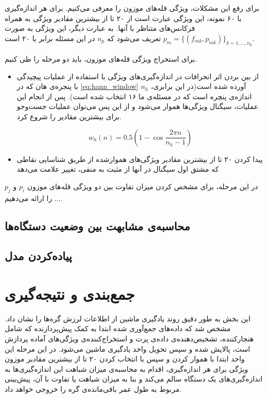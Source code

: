 برای رفع این مشکلات، ویژگی قله‌های موزون را معرفی می‌کنیم. برای هر اندازه‌گیری با ۶۰ نمونه، این ویژگی عبارت است از ۲۰ تا از بیشترین مقادیر ویژگی  به همراه فرکانس‌های متناظر با آنها. به عبارت دیگر، این ویژگی به صورت $p_m = \{(f_{mk}, p_{mk})\}_{k=1, ..., n_p}$ تعریف می‌شود که $n_p$ در این مسئله برابر با ۲۰ است.

برای استخراج ویژگی قله‌های موزون، باید دو مرحله را طی کنیم.
\begin{itemize}
\item از بین بردن اثر انحرافات در اندازه‌گیری‌های ویژگی‌  با استفاده از عملیات پیچیدگی با پنجره‌ی هان که در \cref{eq:hann_window} آورده شده است(در این برابری، $n_h$ اندازه‌ی پنچره است که در مسئله‌ی ما ۱۶ انتخاب شده است). پس از انجام این عملیات، سیگنال ویژگی‌ها هموار می‌شود و از این پس می‌توان عملیات جست‌وجو برای بیشترین مقادیر را شروع کرد.

\begin{equation}
\label{eq:hann_window}
w_h(n) = 0.5 (1 - \cos{\dfrac{2\pi n}{n_h - 1}})
\end{equation}

\item پیدا کردن ۲۰ تا از بیشترین مقادیر ویژگی‌های هموارشده از طریق شناسایی نقاطی که مشتق اول سیگنال در آنها از مثبت به منفی، تغییر علامت می‌دهد

\end{itemize}

در این مرحله، برای مشخص کردن میزان تفاوت بین دو ویژگی قله‌های موزون $p_i$ و $p_j$ ... را ارائه می‌دهیم.

\subsection{محاسبه‌ی مشابهت بین وضعیت دستگاه‌ها}

\subsection{پیاده‌کردن مدل}


\section{جمع‌بندی و نتیجه‌گیری}
این بخش به طور دقیق روند یادگیری ماشین از اطلاعات لرزش گره‌ها را نشان داد. مشخص شد که داده‌های جمع‌آوری شده ابتدا به کمک پیش‌پردازنده که شامل هنجارکننده، تشخیص‌دهنده‌ی داده‌ی پرت و استخراج‌کننده‌ی ویژگی‌های آماده پردازش است، پالایش شده و سپس تحویل واحد یادگیری ماشین می‌شود. در این مرحله این واحد ابتدا با هموار کردن و سپس با انتخاب کردن ۲۰ تا از بیشترین مقادیر موزون ویژگی  برای هر اندازه‌گیری، اقدام به محاسبه‌ی میزان شباهت این اندازه‌گیری‌ها به اندازه‌گیری‌های یک دستگاه سالم می‌کند و بنا به میزان شباهت یا تفاوت با آن، پیش‌بینی مربوط به طول عمر باقی‌مانده‌ی گره را خروجی خواهد داد.